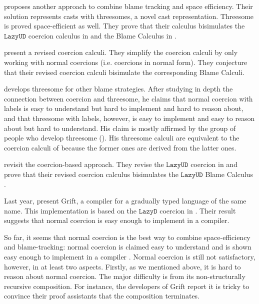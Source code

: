 \documentclass[acmsmall,review,anonymous]{acmart}\settopmatter{printfolios=true,printccs=false,printacmref=false}
\newcommand{\lazyUD}{$\mathtt{Lazy UD}$}
\newcommand{\lazyD}{$\mathtt{Lazy D}$}
\begin{document}
\citet{siek2010threesomes} proposes another approach to combine blame 
tracking and space efficiency. Their solution represents casts with threesomes, 
a novel cast representation. Threesome is proved space-efficient as well.
They prove that their calculus bisimulates the \lazyUD{} coercion 
calculus in \citet{siek2009exploring} and the Blame Calculus in 
\citet{wadler2009well}.

\citet{siek2012interpretations} present a revised coercion calculi.
They simplify the coercion calculi by only 
working with normal coercions (i.e. coercions in normal form). 
They conjecture that their revised coercion calculi bisimulate the 
corresponding Blame Calculi.

\citet{garcia2013calculating} develops
threesome for other blame strategies. After studying in depth the connection 
between coercion and threesome,
he claims that normal coercion with labels is easy to understand but hard to 
implement and hard to reason about, and that 
threesome with labels, however, is easy to implement and easy to reason about 
but hard to understand. 
His claim is mostly affirmed by the group of people who develop threesome 
(\citet{siek2015blame}).
His threesome calculi are equivalent to the coercion calculi of
\citet{siek2009exploring} because the former ones are derived from the latter 
ones.

\citet{siek2015blame} revisit the coercion-based approach. They revise
the \lazyUD{} coercion in \citet{siek2012interpretations} and prove
that their revised coercion calculus bisimulates the \lazyUD{} Blame
Calculus \citet{wadler2009well}.

Last year, \citet{kuhlenschmidt2018efficient} present Grift, a compiler for a 
gradually typed language of the same name. 
This implementation is based on the \lazyD{} coercion in 
\citet{siek2012interpretations}.
Their result suggests that normal coercion is easy enough to implement in a 
compiler. 

So far, it seems that normal coercion is the best way to combine 
space-efficiency and blame-tracking: normal coercion is claimed easy to 
understand \cite{garcia2013calculating}\cite{siek2015blame} and is shown 
easy enough to implement in a compiler \cite{kuhlenschmidt2018efficient}.
Normal coercion is still not satisfactory, however, in at least two aspects.
Firstly, as we mentioned above, it is hard to reason about normal coercion. The 
major difficulty is from its non-structurally recursive composition.
For instance, the developers of Grift report it is tricky to convince
their proof assistants that the composition terminates.
\end{document}
